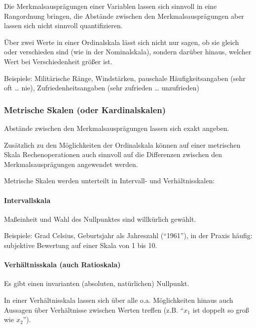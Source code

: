 \documentclass[
  11pt,
  ngerman,
  a4paper,
]{report}
\begin{document}
Die Merkmalsausprägungen einer Variablen lassen sich sinnvoll in eine Rangordnung bringen, die Abstände zwischen den Merkmalsausprägungen aber lassen sich nicht sinnvoll quantifizieren.

Über zwei Werte in einer Ordinalskala lässt sich nicht nur sagen, ob sie gleich oder verschieden sind (wie in der Nominalskala), sondern darüber hinaus, welcher Wert bei Verschiedenheit größer ist.

Beispiele: Militärische Ränge, Windstärken, pauschale Häufigkeitsangaben (sehr oft \ldots{} nie), Zufriedenheitsangaben (sehr zufrieden \ldots{} unzufrieden)

\hypertarget{metrische-skalen-oder-kardinalskalen}{%
\subsubsection{Metrische Skalen (oder Kardinalskalen)}\label{metrische-skalen-oder-kardinalskalen}}

Abstände zwischen den Merkmalsausprägungen lassen sich exakt angeben.

Zusätzlich zu den Möglichkeiten der Ordinalskala können auf einer metrischen Skala Rechenoperationen auch sinnvoll auf die Differenzen zwischen den Merkmalsausprägungen angewendet werden.

Metrische Skalen werden unterteilt in Intervall- und Verhältnisskalen:

\hypertarget{intervallskala}{%
\paragraph{Intervallskala}\label{intervallskala}}

Maßeinheit und Wahl des Nullpunktes sind willkürlich gewählt.

Beispiele: Grad Celsius, Geburtsjahr als Jahreszahl (\enquote{1961}), in der Praxis häufig: subjektive Bewertung auf einer Skala von 1 bis 10.

\hypertarget{verhuxe4ltnisskala-auch-ratioskala}{%
\paragraph{Verhältnisskala (auch Ratioskala)}\label{verhuxe4ltnisskala-auch-ratioskala}}

Es gibt einen invarianten (absoluten, natürlichen) Nullpunkt.

In einer Verhältnisskala lassen sich über alle o.a. Möglichkeiten hinaus auch Aussagen über Verhältnisse zwischen Werten treffen (z.B. \enquote{\(x_1\) ist doppelt so groß wie \(x_2\)}).
\end{document}
